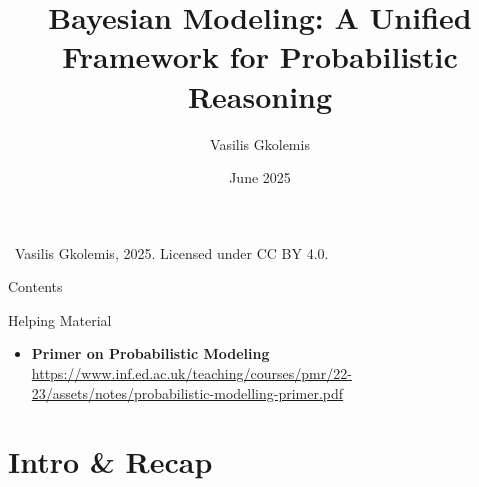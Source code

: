 \documentclass{beamer}
\title{Bayesian Modeling: A Unified Framework for Probabilistic Reasoning}
\author{Vasilis Gkolemis}
\institute{ATHENA RC | HUA}
\date{June 2025}
\begin{document}
\begin{frame}
  \titlepage
  \vfill
  \footnotesize
  \textcopyright\
  Vasilis Gkolemis, 2025. Licensed under CC BY 4.0.
\end{frame}

\begin{frame}{Contents}
  \tableofcontents
\end{frame}


\begin{frame}{Helping Material}
  \begin{itemize}
    \item \textbf{Primer on Probabilistic Modeling} \url{https://www.inf.ed.ac.uk/teaching/courses/pmr/22-23/assets/notes/probabilistic-modelling-primer.pdf}
  \end{itemize}
\end{frame}


\section{Intro \& Recap}
\end{document}
